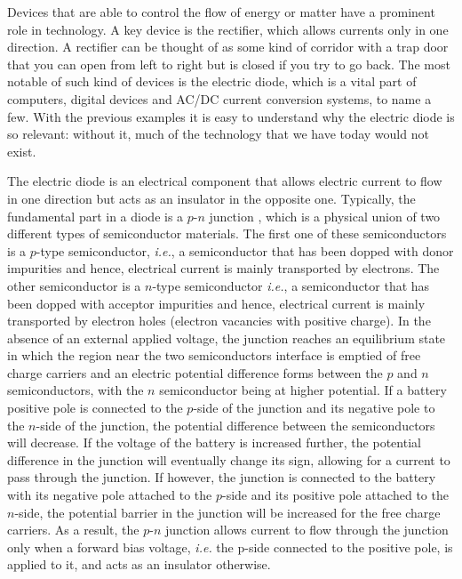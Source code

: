 
\label{Introduction}

Devices that are able to control the flow of energy or matter have a prominent role in technology. A key device is the rectifier, which allows currents only in one direction. A rectifier can be thought of as some kind of corridor with a trap door that you can open from left to right but is closed if you try to go back. The most notable of such kind of devices is the electric diode, which is a vital part of computers, digital devices and AC/DC current conversion systems, to name a few. With the previous examples it is easy to understand why the electric diode is so relevant: without it, much of the technology that we have today would not exist.

The electric diode is an electrical component that allows electric current to flow in one direction but acts as an insulator in the opposite one. Typically, the fundamental part in a diode is a $p$-$n$ junction \cite{Neamen2003}, which is a physical union of two different types of semiconductor materials. The first one of these semiconductors is a $p$-type semiconductor, \textit{i.e.}, a semiconductor that has been dopped with donor impurities and hence, electrical current is mainly transported by electrons. The other semiconductor is a $n$-type semiconductor \textit{i.e.}, a semiconductor that has been dopped with acceptor impurities and hence, electrical current is mainly transported by electron holes (electron vacancies with positive charge). In the absence of an external applied voltage, the junction reaches an equilibrium state in which the region near the two semiconductors interface is emptied of free charge carriers and an electric potential difference forms between the $p$ and $n$ semiconductors, with the $n$ semiconductor being at higher potential. If a battery positive pole is connected to the $p$-side of the junction and its negative pole to the $n$-side of the junction, the potential difference between the semiconductors will decrease. If the voltage of the battery is increased further, the potential difference in the junction will eventually change its sign, allowing for a current to pass through the junction. If however, the junction is connected to the battery with its negative pole attached to the $p$-side and its positive pole attached to the $n$-side, the potential barrier in the junction will be increased for the free charge carriers. As a result, the $p$-$n$ junction allows current to flow through the junction only when a forward bias voltage, \textit{i.e.} the p-side connected to the positive pole, is applied to it, and acts as an insulator otherwise.

